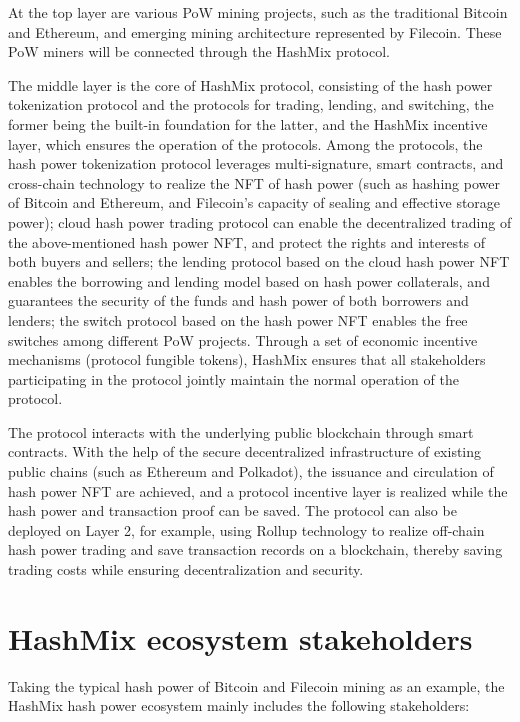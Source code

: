 \documentclass[]{template/llncs}
\begin{document}
At the top layer are various PoW mining projects, such as the traditional Bitcoin and Ethereum, and emerging mining architecture represented by Filecoin. These PoW miners will be connected through the HashMix protocol.

The middle layer is the core of HashMix protocol, consisting of the hash power tokenization protocol and the protocols for trading, lending, and switching, the former being the built-in foundation for the latter, and the HashMix incentive layer, which ensures the operation of the protocols. Among the protocols, the hash power tokenization protocol leverages multi-signature, smart contracts, and cross-chain technology to realize the NFT of hash power (such as hashing power of Bitcoin and Ethereum, and Filecoin’s capacity of sealing and effective storage power); cloud hash power trading protocol can enable the decentralized trading of the above-mentioned hash power NFT, and protect the rights and interests of both buyers and sellers; the lending protocol based on the cloud hash power NFT enables the borrowing and lending model based on hash power collaterals, and guarantees the security of the funds and hash power of both borrowers and lenders; the switch protocol based on the hash power NFT enables the free switches among different PoW projects. Through a set of economic incentive mechanisms (protocol fungible tokens), HashMix ensures that all stakeholders participating in the protocol jointly maintain the normal operation of the protocol.
 
The protocol interacts with the underlying public blockchain through smart contracts. With the help of the secure decentralized infrastructure of existing public chains (such as Ethereum and Polkadot), the issuance and circulation of hash power NFT are achieved, and a protocol incentive layer is realized while the hash power and transaction proof can be saved. The protocol can also be deployed on Layer 2, for example, using Rollup technology to realize off-chain hash power trading and save transaction records on a blockchain, thereby saving trading costs while ensuring decentralization and security. 

\section{HashMix ecosystem stakeholders}

Taking the typical hash power of Bitcoin and Filecoin mining as an example, the HashMix hash power ecosystem mainly includes the following stakeholders: 
\end{document}
